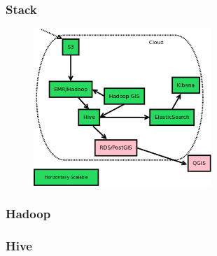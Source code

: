 \documentclass[hyperref={pdfpagelabels=true}]{beamer}
\begin{document}
\begin{frame}
\frametitle{Stack}
    \begin{figure}  
      \includegraphics[width=0.6\textwidth]{stack.png}
      \end{figure}  
\end{frame}


\begin{frame}
\frametitle{Hadoop}
\end{frame}

\begin{frame}
\frametitle{Hive}
\end{frame}
\end{document}
